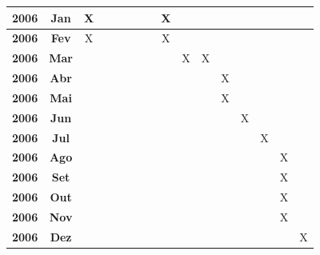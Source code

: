 \documentclass[a4paper,titlepage,12pt]{article}
\begin{document}
\begin{table}[ht]
\begin{center}
\begin{tabular}{|c|c||c|c|c|c|c|c|c|c|c|c|c|c|c|c|}
      {\bf 2006} &{\bf Jan}  & X       &         &        &         &         &         & X      &         &         &         &          &          &          &        \\\hline
      {\bf 2006} &{\bf Fev}  & X       &         &        &         &         &         & X      &         &         &         &          &          &          &        \\\hline
      {\bf 2006} &{\bf Mar}  &         &         &        &         &         &         &        & X       & X       &         &          &          &          &        \\\hline
      {\bf 2006} &{\bf Abr}  &         &         &        &         &         &         &        &         &         & X       &          &          &          &        \\\hline
      {\bf 2006} &{\bf Mai}  &         &         &        &         &         &         &        &         &         & X       &          &          &          &        \\\hline
      {\bf 2006} &{\bf Jun}  &         &         &        &         &         &         &        &         &         &         & X        &          &          &        \\\hline
      {\bf 2006} &{\bf Jul}  &         &         &        &         &         &         &        &         &         &         &          & X        &          &        \\\hline
      {\bf 2006} &{\bf Ago}  &         &         &        &         &         &         &        &         &         &         &          &          &  X       &        \\\hline
      {\bf 2006} &{\bf Set}  &         &         &        &         &         &         &        &         &         &         &          &          &  X       &        \\\hline
      {\bf 2006} &{\bf Out}  &         &         &        &         &         &         &        &         &         &         &          &          &  X       &        \\\hline
      {\bf 2006} &{\bf Nov}  &         &         &        &         &         &         &        &         &         &         &          &          &  X       &        \\\hline
      {\bf 2006} &{\bf Dez}  &         &         &        &         &         &         &        &         &         &         &          &          &          & X      \\\hline
    \end{tabular}
  \end{center}
\end{table}
\end{document}
